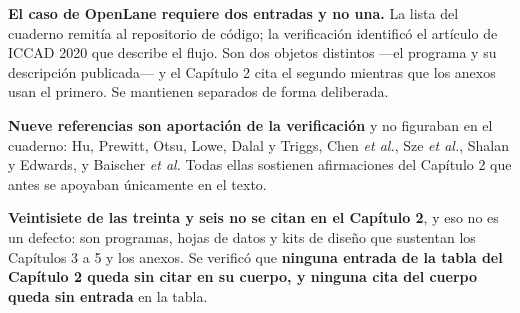 \textbf{El caso de OpenLane requiere dos entradas y no una.} La lista
del cuaderno remitía al repositorio de código; la verificación
identificó el artículo de ICCAD 2020 que describe el flujo. Son dos
objetos distintos ---el programa y su descripción publicada--- y el
Capítulo 2 cita el segundo mientras que los anexos usan el primero. Se
mantienen separados de forma deliberada.

\textbf{Nueve referencias son aportación de la verificación} y no
figuraban en el cuaderno: Hu, Prewitt, Otsu, Lowe, Dalal y Triggs, Chen
\emph{et al.}, Sze \emph{et al.}, Shalan y Edwards, y Baischer \emph{et
al.} Todas ellas sostienen afirmaciones del Capítulo 2 que antes se
apoyaban únicamente en el texto.

\textbf{Veintisiete de las treinta y seis no se citan en el Capítulo 2},
y eso no es un defecto: son programas, hojas de datos y kits de diseño
que sustentan los Capítulos 3 a 5 y los anexos. Se verificó que
\textbf{ninguna entrada de la tabla del Capítulo 2 queda sin citar en su
cuerpo, y ninguna cita del cuerpo queda sin entrada} en la tabla.
